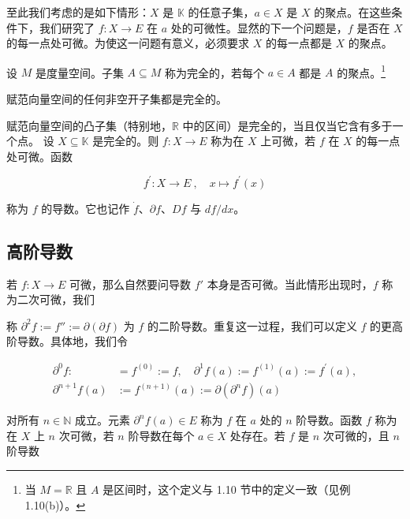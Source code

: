 至此我们考虑的是如下情形：$X$ 是 $\mathbb{K}$ 的任意子集，$a \in X$ 是 $X$ 的聚点。在这些条件下，我们研究了 $f: X \to E$ 在 $a$ 处的可微性。显然的下一个问题是，$f$ 是否在 $X$ 的每一点处可微。为使这一问题有意义，必须要求 $X$ 的每一点都是 $X$ 的聚点。

设 $M$ 是度量空间。子集 $A \subseteq M$ 称为完全的，若每个 $a \in A$ 都是 $A$ 的聚点。\footnote{当 $ M = \mathbb{R} $ 且 $ A $ 是区间时，这个定义与 1.10 节中的定义一致（见例 1.10(b)）。}

\begin{example}

\begin{items}
\item

赋范向量空间的任何非空开子集都是完全的。

\item

赋范向量空间的凸子集（特别地，$ \mathbb{R} $ 中的区间）是完全的，当且仅当它含有多于一个点。
设 $ X \subseteq \mathbb{K} $ 是完全的。则 $ f: X \to E $ 称为在 $ X $ 上可微，若 $ f $ 在 $ X $ 的每一点处可微。函数

\[
f^{\prime}\colon X\to E~,\quad x\mapsto f^{\prime}(x)
\]

称为 $f$ 的导数。它也记作 $\dot{f}$、$\partial f$、$Df$ 与 $df/dx$。

\end{items}

\end{example}

\subsection*{高阶导数}

若 $ f: X \to E $ 可微，那么自然要问导数 $ f' $ 本身是否可微。当此情形出现时，$ f $ 称为二次可微，我们

称 $ \partial^2 f := f'' := \partial(\partial f) $ 为 $ f $ 的二阶导数。重复这一过程，我们可以定义 $ f $ 的更高阶导数。具体地，我们令

\begin{equation*}
\begin{aligned}
\partial^{0}f:&=f^{(0)}:=f,\quad\partial^{1}f(a):=f^{(1)}(a):=f^{\prime}(a),\\\partial^{n+1}f(a)&:=f^{(n+1)}(a):=\partial(\partial^{n}f)(a)
\end{aligned}
\end{equation*}

对所有 $ n \in \mathbb{N} $ 成立。元素 $ \partial^n f(a) \in E $ 称为 $ f $ 在 $ a $ 处的 $ n $ 阶导数。函数 $ f $ 称为在 $ X $ 上 $ n $ 次可微，若 $ n $ 阶导数在每个 $ a \in X $ 处存在。若 $ f $ 是 $ n $ 次可微的，且 $ n $ 阶导数

